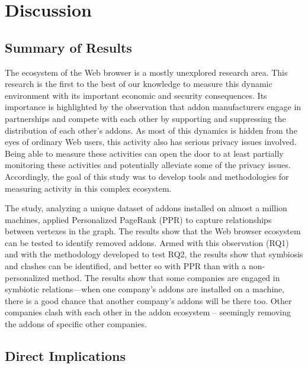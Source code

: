\documentclass[10pt,letterpaper]{article}
\begin{document}
\section*{Discussion}

\subsection*{Summary of Results}

The ecosystem of the Web browser is a mostly unexplored research area. This research is the first to the best of our knowledge to measure this dynamic environment with its important economic and security consequences. Its importance is highlighted by the observation that addon manufacturers engage in partnerships and compete with each other by supporting and suppressing the distribution of each other's addons. As most of this dynamics is hidden from the eyes of ordinary Web users, this activity also has serious privacy issues involved. Being able to measure these activities can open the door to at least partially monitoring these activities and potentially alleviate some of the privacy issues. Accordingly, the goal of this study was to develop tools and methodologies for measuring activity in this complex ecosystem. 

The study, analyzing a unique dataset of addons installed on almost a million machines, applied Personalized PageRank (PPR) to capture relationships between vertexes in the graph. The results show that the Web browser ecosystem can be tested to identify removed addons. Armed with this observation (RQ1) and with the methodology developed to test RQ2, the results show that symbiosis and clashes can be identified, and better so with PPR than with a non-personalized method. The results show that some companies are engaged in symbiotic relations---when one company's addons are installed on a machine, there is a good chance that another company's addons will be there too. Other companies clash with each other in the addon ecosystem -- seemingly removing the addons of specific other companies. 

\subsection*{Direct Implications}
\end{document}
